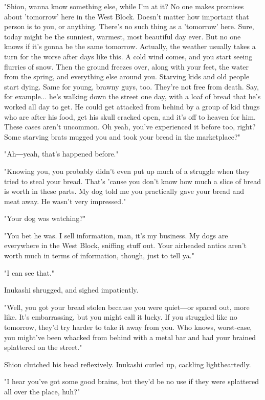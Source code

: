 "Shion, wanna know something else, while I'm at it? No one makes
promises about 'tomorrow' here in the West Block. Doesn't matter how
important that person is to you, or anything. There's no such thing as a
'tomorrow' here. Sure, today might be the sunniest, warmest, most
beautiful day ever. But no one knows if it's gonna be the same tomorrow.
Actually, the weather usually takes a turn for the worse after days like
this. A cold wind comes, and you start seeing flurries of snow. Then the
ground freezes over, along with your feet, the water from the spring,
and everything else around you. Starving kids and old people start
dying. Same for young, brawny guys, too. They're not free from death.
Say, for example... he's walking down the street one day, with a loaf of
bread that he's worked all day to get. He could get attacked from behind
by a group of kid thugs who are after his food, get his skull cracked
open, and it's off to heaven for him. These cases aren't uncommon. Oh
yeah, you've experienced it before too, right? Some starving brats
mugged you and took your bread in the marketplace?"

"Ah―yeah, that's happened before."

"Knowing you, you probably didn't even put up much of a struggle when
they tried to steal your bread. That's 'cause you don't know how much a
slice of bread is worth in these parts. My dog told me you practically
gave your bread and meat away. He wasn't very impressed."

"Your dog was watching?"

"You bet he was. I sell information, man, it's my business. My dogs are
everywhere in the West Block, sniffing stuff out. Your airheaded antics
aren't worth much in terms of information, though, just to tell ya."

"I can see that."

Inukashi shrugged, and sighed impatiently.

"Well, you got your bread stolen because you were quiet―or spaced out,
more like. It's embarrassing, but you might call it lucky. If you
struggled like no tomorrow, they'd try harder to take it away from you.
Who knows, worst-case, you might've been whacked from behind with a
metal bar and had your brained splattered on the street."

Shion clutched his head reflexively. Inukashi curled up, cackling
lightheartedly.

"I hear you've got some good brains, but they'd be no use if they were
splattered all over the place, huh?"

